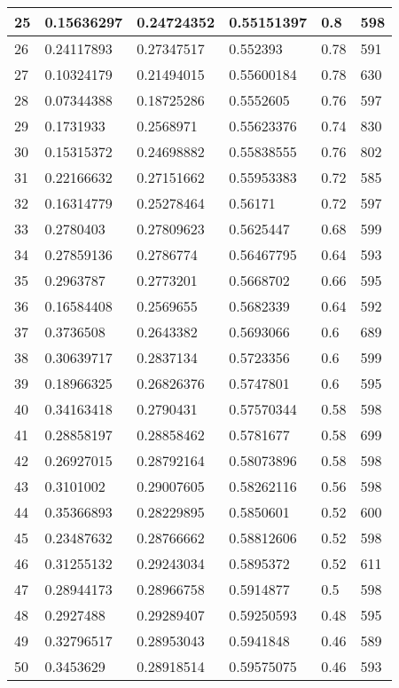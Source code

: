 \begin{longtable}{|l|l|l|l|l|l|}
25 & 0.15636297 & 0.24724352 & 0.55151397 & 0.8 & 598 \\ \hline 
26 & 0.24117893 & 0.27347517 & 0.552393 & 0.78 & 591 \\ \hline 
27 & 0.10324179 & 0.21494015 & 0.55600184 & 0.78 & 630 \\ \hline 
28 & 0.07344388 & 0.18725286 & 0.5552605 & 0.76 & 597 \\ \hline 
29 & 0.1731933 & 0.2568971 & 0.55623376 & 0.74 & 830 \\ \hline 
30 & 0.15315372 & 0.24698882 & 0.55838555 & 0.76 & 802 \\ \hline 
31 & 0.22166632 & 0.27151662 & 0.55953383 & 0.72 & 585 \\ \hline 
32 & 0.16314779 & 0.25278464 & 0.56171 & 0.72 & 597 \\ \hline 
33 & 0.2780403 & 0.27809623 & 0.5625447 & 0.68 & 599 \\ \hline 
34 & 0.27859136 & 0.2786774 & 0.56467795 & 0.64 & 593 \\ \hline 
35 & 0.2963787 & 0.2773201 & 0.5668702 & 0.66 & 595 \\ \hline 
36 & 0.16584408 & 0.2569655 & 0.5682339 & 0.64 & 592 \\ \hline 
37 & 0.3736508 & 0.2643382 & 0.5693066 & 0.6 & 689 \\ \hline 
38 & 0.30639717 & 0.2837134 & 0.5723356 & 0.6 & 599 \\ \hline 
39 & 0.18966325 & 0.26826376 & 0.5747801 & 0.6 & 595 \\ \hline 
40 & 0.34163418 & 0.2790431 & 0.57570344 & 0.58 & 598 \\ \hline 
41 & 0.28858197 & 0.28858462 & 0.5781677 & 0.58 & 699 \\ \hline 
42 & 0.26927015 & 0.28792164 & 0.58073896 & 0.58 & 598 \\ \hline 
43 & 0.3101002 & 0.29007605 & 0.58262116 & 0.56 & 598 \\ \hline 
44 & 0.35366893 & 0.28229895 & 0.5850601 & 0.52 & 600 \\ \hline 
45 & 0.23487632 & 0.28766662 & 0.58812606 & 0.52 & 598 \\ \hline 
46 & 0.31255132 & 0.29243034 & 0.5895372 & 0.52 & 611 \\ \hline 
47 & 0.28944173 & 0.28966758 & 0.5914877 & 0.5 & 598 \\ \hline 
48 & 0.2927488 & 0.29289407 & 0.59250593 & 0.48 & 595 \\ \hline 
49 & 0.32796517 & 0.28953043 & 0.5941848 & 0.46 & 589 \\ \hline 
50 & 0.3453629 & 0.28918514 & 0.59575075 & 0.46 & 593 \\ \hline 
\end{longtable}